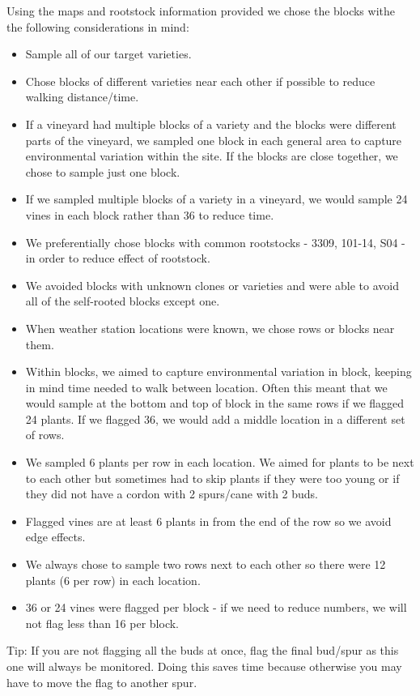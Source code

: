 \documentclass[11pt,letter]{article}
\newenvironment{smitemize}{
\begin{itemize}
  \setlength{\itemsep}{0pt}
  \setlength{\parskip}{0.8pt}
  \setlength{\parsep}{0pt}}
{\end{itemize}
}
\begin{document}
Using the maps and rootstock information provided we chose the blocks withe the following considerations in mind:
\begin{smitemize}
\item Sample all of our target varieties.
\item Chose blocks of different varieties near each other if possible to reduce walking distance/time. 
\item If a vineyard had multiple blocks of a variety and the blocks were different parts of the vineyard, we sampled one block in each general area to capture environmental variation within the site. If the blocks are close together, we chose to sample just one block.
\item If we sampled multiple blocks of a variety in a vineyard, we would sample 24 vines in each block rather than 36 to reduce time.
\item We preferentially chose blocks with common rootstocks - 3309, 101-14, S04 - in order to reduce effect of rootstock.
\item We avoided blocks with unknown clones or varieties and were able to avoid all of the self-rooted blocks except one.
\item When weather station locations were known, we chose rows or blocks near them.
\item Within blocks, we aimed to capture environmental variation in block, keeping in mind time needed to walk between location. Often this meant that we would sample at the bottom and top of block in the same rows if we flagged 24 plants. If we flagged 36, we would add a middle location in a different set of rows. 
\item We sampled 6 plants per row in each location. We aimed for plants to be next to each other but sometimes had to skip plants if they were too young or if they did not have a cordon with 2 spurs/cane with 2 buds.
\item Flagged vines are at least 6 plants in from the end of the row so we avoid edge effects.
\item We always chose to sample two rows next to each other so there were 12 plants (6 per row) in each location.
\item 36 or 24 vines were flagged per block - if we need to reduce numbers, we will not flag less than 16 per block.

\end{smitemize}

Tip: If you are not flagging all the buds at once, flag the final bud/spur as this one will always be monitored. Doing this saves time because otherwise you may have to move the flag to another spur.
\end{document}
